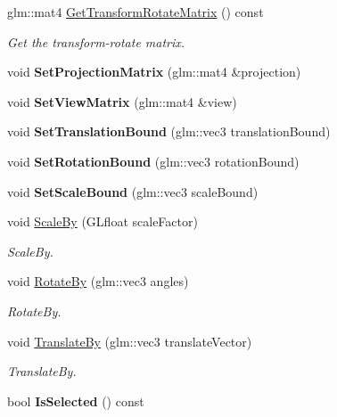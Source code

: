 \begin{DoxyCompactItemize}
\item 
\hypertarget{class_model_container_a9f7fc23d5b09502dbb442b3f65c294ce}{}glm\+::mat4 \hyperlink{class_model_container_a9f7fc23d5b09502dbb442b3f65c294ce}{Get\+Transform\+Rotate\+Matrix} () const \label{class_model_container_a9f7fc23d5b09502dbb442b3f65c294ce}

\begin{DoxyCompactList}\small\item\em Get the transform-\/rotate matrix. \end{DoxyCompactList}\item 
\hypertarget{class_model_container_a2a91fc30179a9da8195e704bcf6bb179}{}void {\bfseries Set\+Projection\+Matrix} (glm\+::mat4 \&projection)\label{class_model_container_a2a91fc30179a9da8195e704bcf6bb179}

\item 
\hypertarget{class_model_container_a14648db778747762f55ad52396225efa}{}void {\bfseries Set\+View\+Matrix} (glm\+::mat4 \&view)\label{class_model_container_a14648db778747762f55ad52396225efa}

\item 
\hypertarget{class_model_container_afb5c293199114bcd6da5bea8b964b732}{}void {\bfseries Set\+Translation\+Bound} (glm\+::vec3 translation\+Bound)\label{class_model_container_afb5c293199114bcd6da5bea8b964b732}

\item 
\hypertarget{class_model_container_a9d5ae2036e06e9230942fb45b8f5156a}{}void {\bfseries Set\+Rotation\+Bound} (glm\+::vec3 rotation\+Bound)\label{class_model_container_a9d5ae2036e06e9230942fb45b8f5156a}

\item 
\hypertarget{class_model_container_a9bc78b840b5bb544db86cb5956b17a12}{}void {\bfseries Set\+Scale\+Bound} (glm\+::vec3 scale\+Bound)\label{class_model_container_a9bc78b840b5bb544db86cb5956b17a12}

\item 
void \hyperlink{class_model_container_ac8d13143fdc69ce02d2539dd677bc3db}{Scale\+By} (G\+Lfloat scale\+Factor)
\begin{DoxyCompactList}\small\item\em Scale\+By. \end{DoxyCompactList}\item 
void \hyperlink{class_model_container_a40a0e922136e185a3808dac214d9cea8}{Rotate\+By} (glm\+::vec3 angles)
\begin{DoxyCompactList}\small\item\em Rotate\+By. \end{DoxyCompactList}\item 
void \hyperlink{class_model_container_ac33db8cfd1cac6742735dcc0226feff0}{Translate\+By} (glm\+::vec3 translate\+Vector)
\begin{DoxyCompactList}\small\item\em Translate\+By. \end{DoxyCompactList}\item 
\hypertarget{class_model_container_a349647d2eccc777419ff6eeb8edeff90}{}bool {\bfseries Is\+Selected} () const \label{class_model_container_a349647d2eccc777419ff6eeb8edeff90}


\end{DoxyCompactItemize}

